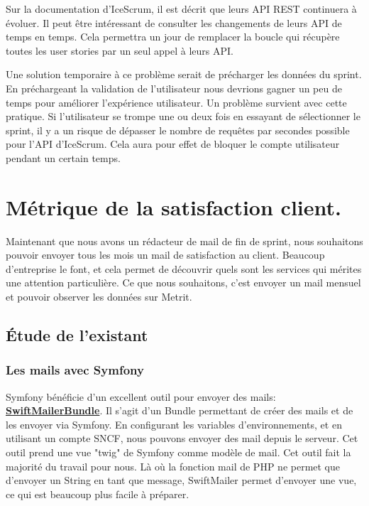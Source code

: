 \documentclass[12pt, twoside, openright]{report}
\begin{document}
Sur la documentation d'IceScrum, il est décrit que leurs API REST continuera à évoluer. Il peut être intéressant de consulter les changements de leurs API de temps en temps. Cela permettra un jour de remplacer la boucle qui récupère toutes les user stories par un seul appel à leurs API.

Une solution temporaire à ce problème serait de précharger les données du sprint. En préchargeant la validation de l'utilisateur nous devrions gagner un peu de temps pour améliorer l’expérience utilisateur. Un problème survient avec cette pratique. Si l'utilisateur se trompe une ou deux fois en essayant de sélectionner le sprint, il y a un risque de dépasser le nombre de requêtes par secondes possible pour l'API d'IceScrum. Cela aura pour effet de bloquer le compte utilisateur pendant un certain temps. 

\section{Métrique de la satisfaction client.}

Maintenant que nous avons un rédacteur de mail de fin de sprint, nous souhaitons pouvoir envoyer tous les mois un mail de satisfaction au client. Beaucoup d'entreprise le font, et cela permet de découvrir quels sont les services qui mérites une attention particulière. Ce que nous souhaitons, c'est envoyer un mail mensuel et pouvoir observer les données sur Metrit.

\subsection{Étude de l'existant}

\subsubsection{Les mails avec Symfony}

Symfony bénéficie d'un excellent outil pour envoyer des mails: \href{https://symfony.com/doc/current/email.html}{\textbf{SwiftMailerBundle}}. Il s'agit d'un Bundle permettant de créer des mails et de les envoyer via Symfony. En configurant les variables d'environnements, et en utilisant un compte SNCF, nous pouvons envoyer des mail depuis le serveur. Cet outil prend une vue "twig" de Symfony comme modèle de mail. Cet outil fait la majorité du travail pour nous. Là où la fonction mail de PHP ne permet que d'envoyer un String en tant que message, SwiftMailer permet d'envoyer une vue, ce qui est beaucoup plus facile à préparer. 
\end{document}
